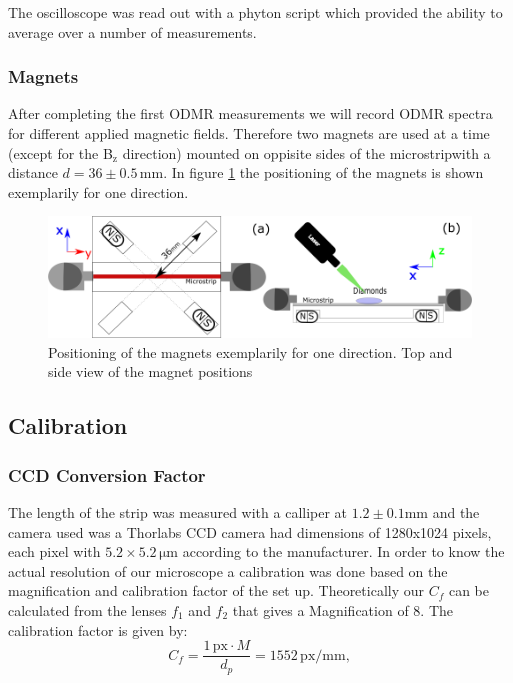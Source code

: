 The oscilloscope was read out with a phyton script which provided the ability to average over a number of measurements.
 
 \subsubsection{Magnets}
 
After completing the first ODMR measurements we will record ODMR spectra for different applied magnetic fields. Therefore two magnets are used at a time (except for the B$_\mathrm{z}$ direction) mounted on oppisite sides of the microstripwith a distance $d=36 \pm 0.5\,\mathrm{mm}$. In figure \ref{fig:magnets} the positioning of the magnets is shown exemplarily for one direction.
\begin{figure}
	\centering
	\includegraphics[width=0.7\linewidth]{../figures/magnets}
	\caption[Positioning of the magnets]{Positioning of the magnets exemplarily for one direction. Top and side view of the magnet positions}
	\label{fig:magnets}
\end{figure}


\subsection{Calibration}

\subsubsection{CCD Conversion Factor}
\label{sec:sizecal}

The length of the strip was measured with a calliper at $1.2\pm 0.1\mathrm{mm}$ and the camera used was a Thorlabs CCD camera had dimensions of 1280x1024 pixels, each pixel with $5.2\times5.2\,\mathrm{\mu m}$ according to the manufacturer.
In order to know the actual resolution of our microscope a calibration was done based on the magnification and calibration factor of the set up.
Theoretically our $C_{f}$ can be calculated from the lenses $f_{1}$ and $f_{2}$ that gives a Magnification of 8. The calibration factor is given by:
\\

\begin{equation}
C_{f}=\dfrac{1\,\mathrm{px} \cdot M}{d_{p}} = 1552\,\mathrm{px/mm,}
\end{equation}\\

